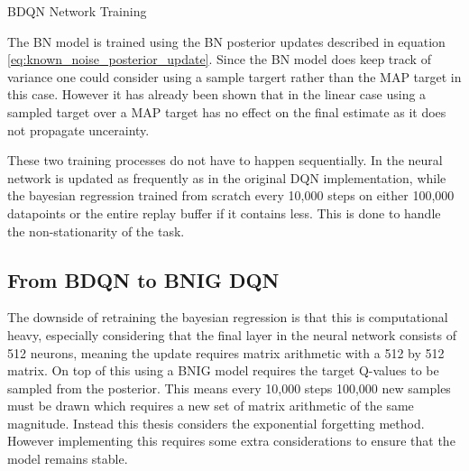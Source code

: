 \begin{algorithm}[H] 
    \caption{BDQN Network Training} 
    \label{alg:BDQN_train} 
\end{algorithm}

The BN model is trained using the BN posterior updates described in equation \ref{eq:known_noise_posterior_update}. Since the BN model does keep track of variance one could consider using a sample targert rather than the MAP target in this case. However it has already been shown that in the linear case using a sampled target over a MAP target has no effect on the final estimate as it does not propagate uncerainty.

These two training processes do not have to happen sequentially. In \cite{azziz_2018} the neural network is updated as frequently as in the original DQN implementation, while the bayesian regression trained from scratch every 10,000 steps on either 100,000 datapoints or the entire replay buffer if it contains less. This is done to handle the non-stationarity of the task. 

\subsection{From BDQN to BNIG DQN}

The downside of retraining the bayesian regression is that this is computational heavy, especially considering that the final layer in the neural network consists of 512 neurons, meaning the update requires matrix arithmetic with a 512 by 512 matrix. On top of this using a BNIG model requires the target Q-values to be sampled from the posterior. This means every 10,000 steps 100,000 new samples must be drawn which requires a new set of matrix arithmetic of the same magnitude. Instead this thesis considers the exponential forgetting method. However implementing this requires some extra considerations to ensure that the model remains stable.

